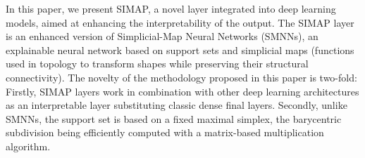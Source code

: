 In this paper, we present SIMAP, a novel layer integrated into deep learning models, aimed at enhancing 
the interpretability of the output.
The SIMAP layer is an enhanced version of Simplicial-Map Neural Networks (SMNNs), an 
explainable neural network based on support sets and simplicial maps (functions 
 used in topology to transform shapes while preserving their structural connectivity).
The novelty of the methodology proposed in this paper is two-fold: 
Firstly, SIMAP layers work in combination with other deep learning architectures as an interpretable layer substituting classic dense final layers. 
Secondly, unlike SMNNs,
the support set is based on a fixed maximal simplex, the barycentric subdivision being efficiently computed with a matrix-based multiplication algorithm.